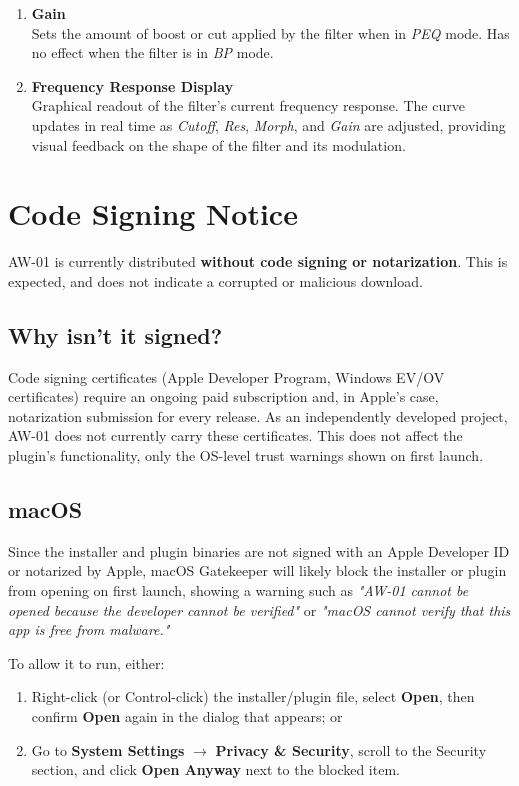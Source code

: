 \documentclass[11pt]{article}
\begin{document}
\begin{enumerate}[label=\textbf{\arabic*.}, leftmargin=2em]
\item \textbf{Gain} \\
Sets the amount of boost or cut applied by the filter when in \textit{PEQ} mode. Has no effect when the filter is in \textit{BP} mode.

\item \textbf{Frequency Response Display} \\
Graphical readout of the filter's current frequency response. The curve updates in real time as \textit{Cutoff}, \textit{Res}, \textit{Morph}, and \textit{Gain} are adjusted, providing visual feedback on the shape of the filter and its modulation.

\end{enumerate}

\section*{Code Signing Notice}

AW-01 is currently distributed \textbf{without code signing or notarization}. This is expected, and does not indicate a corrupted or malicious download.

\subsection*{Why isn't it signed?}

Code signing certificates (Apple Developer Program, Windows EV/OV certificates) require an ongoing paid subscription and, in Apple's case, notarization submission for every release. As an independently developed project, AW-01 does not currently carry these certificates. This does not affect the plugin's functionality, only the OS-level trust warnings shown on first launch.

\subsection*{macOS}

Since the installer and plugin binaries are not signed with an Apple Developer ID or notarized by Apple, macOS Gatekeeper will likely block the installer or plugin from opening on first launch, showing a warning
such as \textit{"AW-01 cannot be opened because the developer cannot be verified"} or \textit{"macOS cannot verify that this app is free from malware."}

To allow it to run, either:

\begin{enumerate}
    \item Right-click (or Control-click) the installer/plugin file, select \textbf{Open}, then confirm \textbf{Open} again in the dialog that appears; or

    \item Go to \textbf{System Settings} $\rightarrow$ \textbf{Privacy \& Security}, scroll to the Security section, and click \textbf{Open Anyway} next to the blocked item.
\end{enumerate}
\end{document}
